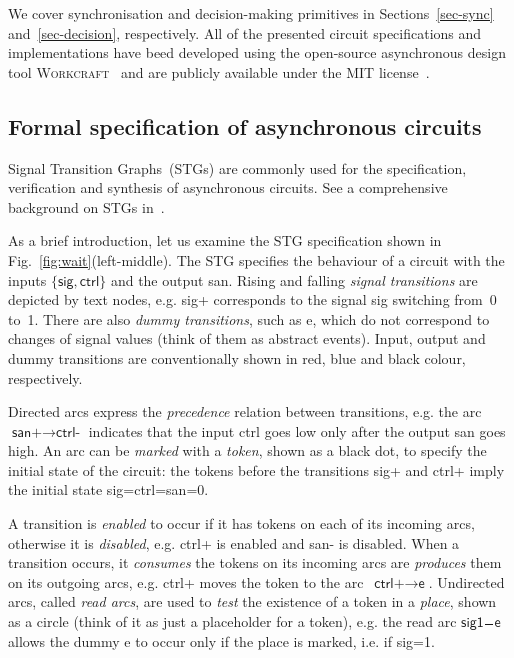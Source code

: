 \documentclass[conference]{IEEEtran}
\begin{document}
We cover synchronisation and
decision-making primitives in Sections~\ref{sec-sync} and~\ref{sec-decision}, respectively.
All of the presented circuit specifications and implementations have beed developed using
the open-source asynchronous design tool \textsc{Workcraft}~\cite{Workcraft_website} and are
publicly available under the MIT license~\cite{Arbitration_primitives_github}.


\subsection*{Formal specification of asynchronous circuits}\label{sec-stg}

Signal Transition Graphs~(STGs) are commonly used for the specification,
verification and synthesis of asynchronous circuits. See a comprehensive
background on STGs in~\cite{2002_cortadella_book}.

As a brief introduction, let us examine the STG specification shown in
Fig.~\ref{fig:wait}(left-middle). The STG specifies the behaviour
of a circuit with the inputs $\{\textsf{sig}, \textsf{ctrl}\}$
and the output \textsf{san}. Rising and falling \emph{signal transitions} are depicted by text
nodes, e.g. \textsf{sig+} corresponds to the signal \textsf{sig} switching from~0 to~1.
There are also \emph{dummy transitions}, such as \textsf{e}, which do not correspond to
changes of signal values (think of them as abstract events).
Input, output and dummy transitions are conventionally shown in red, blue and black
colour, respectively.

Directed arcs express the \emph{precedence} relation
between transitions, e.g. the arc $\textsf{san+} \longrightarrow \textsf{ctrl-}$ indicates
that the input \textsf{ctrl} goes low only after the output \textsf{san} goes high.
An arc can be \emph{marked} with a \emph{token}, shown as a black dot, to specify
the initial state of the circuit: the tokens before the transitions \textsf{sig+} and
\textsf{ctrl+} imply the initial state \textsf{sig=ctrl=san=0}.

A transition is \emph{enabled} to occur if it has tokens on each of its incoming
arcs, otherwise it is \emph{disabled}, e.g. \textsf{ctrl+} is enabled and \textsf{san-}
is disabled. When a transition occurs, it \emph{consumes} the tokens on its incoming arcs
are \emph{produces} them on its outgoing arcs, e.g. \textsf{ctrl+} moves the token to the
arc~$\textsf{ctrl+} \longrightarrow \textsf{e}$. Undirected arcs, called
\emph{read arcs}, are used to \emph{test} the existence of a token in a \emph{place}, shown as
a circle (think of it as just a placeholder for a token), e.g. the read arc
$\textsf{sig1} \frac{~~~~}{~} \textsf{e}$ allows the dummy \textsf{e} to occur only if
the place is marked, i.e. if \textsf{sig=1}.
\end{document}
